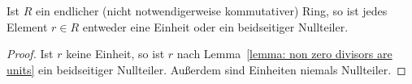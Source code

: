 \begin{itemize}
    \begin{corollary}
      Ist $R$ ein endlicher \textup(nicht notwendigerweise kommutativer\textup) Ring, so ist jedes Element $r \in R$ entweder eine Einheit oder ein beidseitiger Nullteiler.
    \end{corollary}
    
    \begin{proof}
      Ist $r$ keine Einheit, so ist $r$ nach Lemma~\ref{lemma: non zero divisors are units} ein beidseitiger Nullteiler.
      Außerdem sind Einheiten niemals Nullteiler.
    \end{proof}
\end{itemize}





\addtocounter{subsection}{1}





\addtocounter{subsection}{1}





\addtocounter{subsection}{1}





\addtocounter{subsection}{1}





\addtocounter{subsection}{1}




